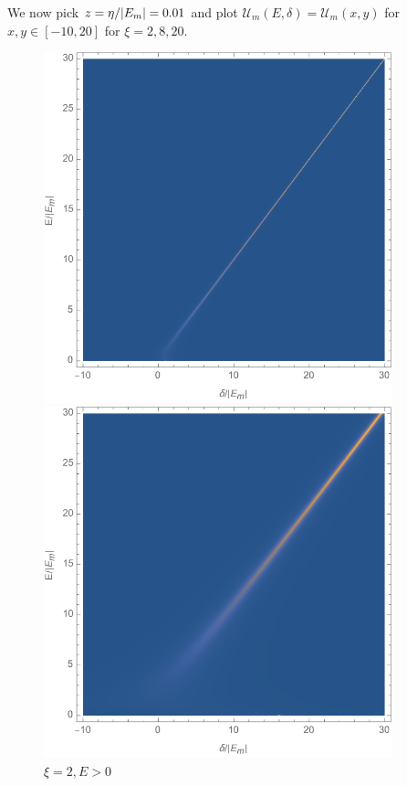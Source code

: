 \documentclass{article}
\theoremstyle{definition}
\begin{document}
\begin{enumerate}[label=(\alph*)]
We now pick $z = \eta/\abs{E_m} = 0.01$ and plot $\mathcal{U}_m(E,\delta) = \mathcal{U}_m(x,y)$ for $x,y \in [-10,20]$ for $\xi = 2,8,20$. 

\begin{figure}[!htb]
\centering
\begin{minipage}{0.3\textwidth}
\includegraphics[width=0.9\textwidth]{UmE_density_plot.png}
\caption{$\xi = 2, E > 0$}
\end{minipage}
\begin{minipage}{0.3\textwidth}
\includegraphics[width=0.9\textwidth]{UmE_density_plot_8.png}

\end{minipage}
\end{figure}
\end{enumerate}
\end{document}
